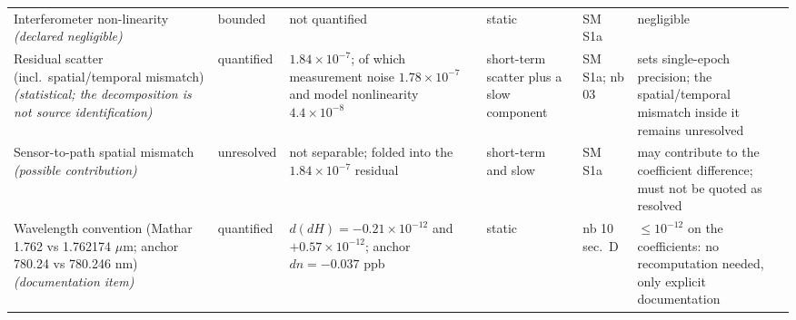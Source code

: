 \begin{table}[htbp]
\begin{tabular}{@{}p{}p{}p{}p{}p{}p{}@{}}
Interferometer non-linearity \emph{(declared negligible)} & bounded & not quantified & static & SM S1a & negligible \\
Residual scatter (incl.\ spatial/temporal mismatch) \emph{(statistical; the decomposition is not source identification)} & quantified & $1.84\times10^{-7}$; of which measurement noise $1.78\times10^{-7}$ and model nonlinearity $4.4\times10^{-8}$ & short-term scatter plus a slow component & SM S1a; nb 03 & sets single-epoch precision; the spatial/temporal mismatch inside it remains unresolved \\
Sensor-to-path spatial mismatch \emph{(possible contribution)} & unresolved & not separable; folded into the $1.84\times10^{-7}$ residual & short-term and slow & SM S1a & may contribute to the coefficient difference; must not be quoted as resolved \\
Wavelength convention (Mathar 1.762 vs 1.762174 $\mu$m; anchor 780.24 vs 780.246 nm) \emph{(documentation item)} & quantified & $d(dH) = -0.21\times10^{-12}$ and $+0.57\times10^{-12}$; anchor $dn = -0.037$ ppb & static & nb 10 sec.~D & $\leq 10^{-12}$ on the coefficients: no recomputation needed, only explicit documentation \\
\hline
\end{tabular}
\end{table}

